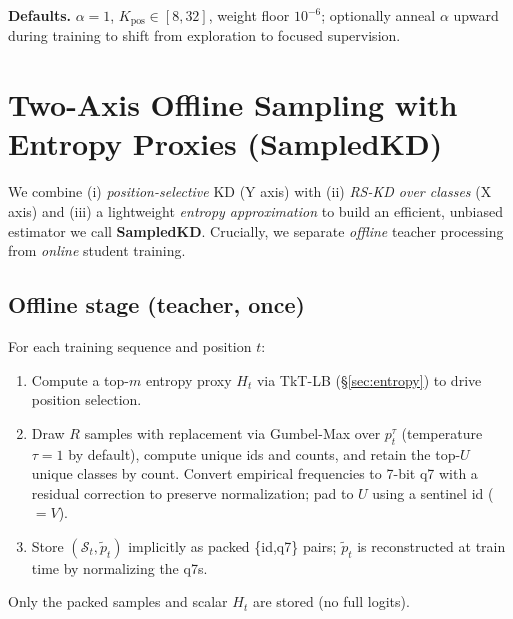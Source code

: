 \documentclass[11pt]{article}
\begin{document}
\vspace{0.5em}
\noindent\textbf{Defaults.}
$\alpha{=}1$, $K_{\text{pos}}\!\in\![8,32]$, weight floor $10^{-6}$; optionally anneal $\alpha$ upward during training to shift from exploration to focused supervision.


\section{Two-Axis Offline Sampling with Entropy Proxies (SampledKD)}
\label{sec:twoaxis}

We combine (i) \emph{position-selective} KD (Y axis) with (ii) \emph{RS-KD over classes} (X axis) and (iii) a lightweight \emph{entropy approximation} to build an efficient, unbiased estimator we call \textbf{SampledKD}.
Crucially, we separate \emph{offline} teacher processing from \emph{online} student training.

\subsection{Offline stage (teacher, once)}
For each training sequence and position $t$:
\begin{enumerate}
	\item Compute a top-$m$ entropy proxy $H_t$ via TkT-LB (\S\ref{sec:entropy}) to drive position selection.
	\item Draw $R$ samples with replacement via Gumbel-Max over $p_t^\tau$ (temperature $\tau{=}1$ by default), compute unique ids and counts, and retain the top-$U$ unique classes by count. Convert empirical frequencies to 7-bit q7 with a residual correction to preserve normalization; pad to $U$ using a sentinel id ($=V$).
	\item Store $(\mathcal{S}_t,\tilde p_t)$ implicitly as packed \{id,q7\} pairs; $\tilde p_t$ is reconstructed at train time by normalizing the q7s.
\end{enumerate}
Only the packed samples and scalar $H_t$ are stored (no full logits).
\end{document}
